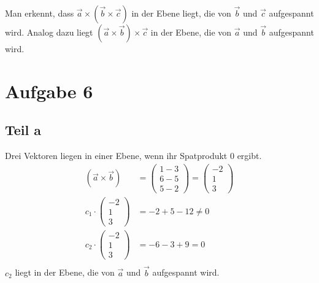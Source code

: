 \documentclass[a4paper,10pt]{extarticle}
\begin{document}
Man erkennt, dass $\vec{a} \times (\vec{b} \times \vec{c})$
in der Ebene liegt, die von $\vec{b}$ und $\vec{c}$ aufgespannt wird.
Analog dazu liegt $(\vec{a}\times\vec{b})\times\vec{c}$ in der Ebene, die von 
$\vec{a}$ und $\vec{b}$ aufgespannt wird.

  \section*{Aufgabe 6}
  \subsection*{Teil a}
  Drei Vektoren liegen in einer Ebene, wenn ihr Spatprodukt $0$ ergibt.
  \begin{align*}
  (\vec{a} \times \vec{b}) &= \begin{pmatrix}1 - 3\\6 - 5\\5 - 2\end{pmatrix} = \begin{pmatrix}-2\\1\\3\end{pmatrix} \\
  c_1 \cdot \begin{pmatrix}-2\\1\\3\end{pmatrix} &= -2 + 5 - 12 \neq 0 \\
  c_2 \cdot \begin{pmatrix}-2\\1\\3\end{pmatrix} &= -6 - 3 + 9 = 0 \\
  \end{align*}
  $c_2$ liegt in der Ebene, die von $\vec{a}$ und $\vec{b}$ aufgespannt wird.
\end{document}
